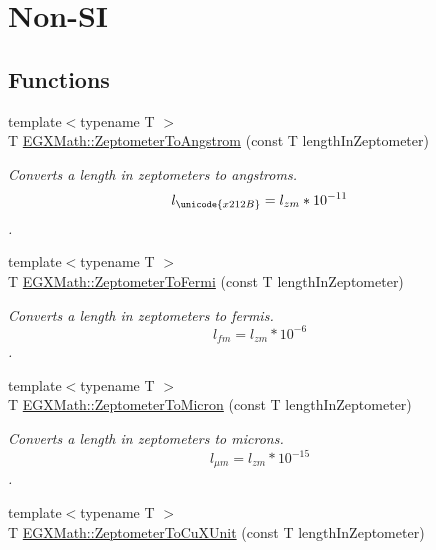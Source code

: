 \hypertarget{group___e_g_x_math-_conversions-_length_conversions-_zeptometer-_non-_s_i}{}\section{Non-\/\+SI}
\label{group___e_g_x_math-_conversions-_length_conversions-_zeptometer-_non-_s_i}
\subsection*{Functions}
\begin{DoxyCompactItemize}
\item 
{\footnotesize template$<$typename T $>$ }\\T \mbox{\hyperlink{group___e_g_x_math-_conversions-_length_conversions-_zeptometer-_non-_s_i_gaa7023afd2a269dddf741cb4299803ef2}{E\+G\+X\+Math\+::\+Zeptometer\+To\+Angstrom}} (const T length\+In\+Zeptometer)
\begin{DoxyCompactList}\small\item\em Converts a length in zeptometers to angstroms. \[ l_{\unicode{x212B}}=l_{zm} * 10^{-11} \]. \end{DoxyCompactList}\item 
{\footnotesize template$<$typename T $>$ }\\T \mbox{\hyperlink{group___e_g_x_math-_conversions-_length_conversions-_zeptometer-_non-_s_i_ga15c5cde158a9916cc01d998c7abc38c4}{E\+G\+X\+Math\+::\+Zeptometer\+To\+Fermi}} (const T length\+In\+Zeptometer)
\begin{DoxyCompactList}\small\item\em Converts a length in zeptometers to fermis. \[ l_{fm}=l_{zm} * 10^{-6} \]. \end{DoxyCompactList}\item 
{\footnotesize template$<$typename T $>$ }\\T \mbox{\hyperlink{group___e_g_x_math-_conversions-_length_conversions-_zeptometer-_non-_s_i_ga0bd42e8489b135f27530a247193286da}{E\+G\+X\+Math\+::\+Zeptometer\+To\+Micron}} (const T length\+In\+Zeptometer)
\begin{DoxyCompactList}\small\item\em Converts a length in zeptometers to microns. \[ l_{\mu m}=l_{zm} * 10^{-15} \]. \end{DoxyCompactList}\item 
{\footnotesize template$<$typename T $>$ }\\T \mbox{\hyperlink{group___e_g_x_math-_conversions-_length_conversions-_zeptometer-_non-_s_i_gaeeff3d1ea7d8cd0c703419ce16fcadd7}{E\+G\+X\+Math\+::\+Zeptometer\+To\+Cu\+X\+Unit}} (const T length\+In\+Zeptometer)

\end{DoxyCompactItemize}
